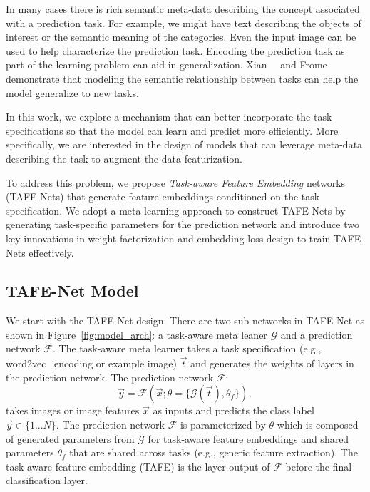 \documentclass[10pt,twocolumn,letterpaper]{article}
\newcommand{\joey}[1]{\textcolor{blue}{[Joey: #1]}}
\newcommand{\model}{TAFE-Net\xspace}
\newcommand{\modelplural}{TAFE-Nets\xspace}
\begin{document}
In many cases there is rich semantic meta-data describing the concept associated with a prediction task.
For example, we might have text describing the objects of interest or the semantic meaning of the categories.
Even the input image can be used to help characterize the prediction task. 
Encoding the prediction task as part of the learning problem can aid in generalization.
Xian~\etal~\cite{xian2018zero} and Frome~\etal~\cite{frome2013devise} demonstrate that modeling 
the semantic relationship between tasks can help the model 
generalize to new tasks. 


In this work, we explore a mechanism 
that can better incorporate
the task specifications so that the model can learn and 
predict more efficiently. 
More specifically, we are
interested in the design of models that can leverage meta-data describing the task to augment the data featurization.


To address this problem, we propose \textit{Task-aware
Feature Embedding} networks (\modelplural) that generate 
feature embeddings conditioned on the task specification.
We adopt a meta learning approach to construct \modelplural
by generating task-specific parameters for the prediction
network and introduce two key innovations in weight 
factorization and embedding loss design to train \modelplural
effectively. 

\subsection{\model Model}
We start with the \model design. There are two sub-networks
in \model as shown in Figure~\ref{fig:model_arch}: a 
task-aware meta leaner $\mathcal{G}$ and a prediction network
$\mathcal{F}$. The task-aware meta learner takes a task specification (e.g., word2vec~\cite{mikolov2013efficient} encoding or example image) $\Vec{t}$ and generates the weights of layers in the prediction network. 
The prediction network $\mathcal{F}$: 
\begin{equation}
    \Vec{y} = \mathcal{F}(\Vec{x}; \theta=\{\mathcal{G}(\Vec{t}), \theta_f\}),
\end{equation}
takes images or image features  $\Vec{x}$ as inputs and predicts the class label $\Vec{y}\in\{1...N\}$.
The prediction network $\mathcal{F}$ is parameterized by $\theta$ which is composed
of generated parameters from $\mathcal{G}$ for task-aware feature embeddings 
and shared parameters  $\theta_f$ that are shared across tasks (e.g., generic feature extraction). 
The task-aware feature embedding (TAFE) is the layer output
of $\mathcal{F}$ before the final classification layer. 
\end{document}
